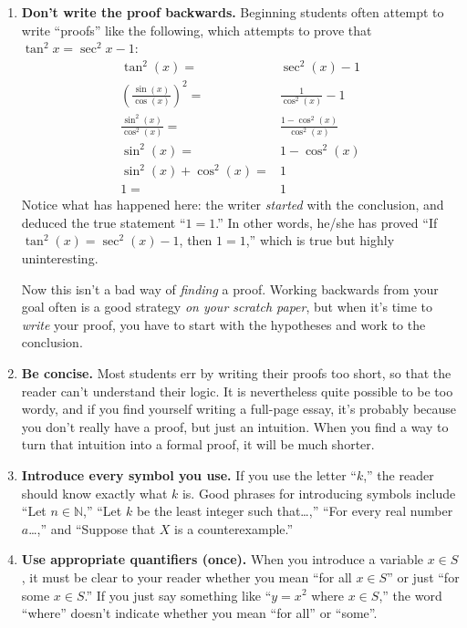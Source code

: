 \begin{enumerate}
\item \textbf{Don't write the proof backwards.} Beginning students often attempt to write ``proofs'' like the following, which attempts to prove that $\tan^2 x  = \sec^2 x - 1$:
\begin{align*}
\tan^2(x) =& \sec^2(x) - 1 \\
\left(\frac{\sin(x)}{\cos(x)}\right)^2 =& \frac{1}{\cos^2(x)} - 1 \\
\frac{\sin^2(x)}{\cos^2(x)} =&  \frac{1-\cos^2(x)}{\cos^2(x)} \\
\sin^2(x) =& 1-\cos^2(x) \\
\sin^2(x) + \cos^2(x) =& 1 \\
1 =& 1
\end{align*}
Notice what has happened here:  the writer \emph{started} with the conclusion, and deduced the true statement ``$1=1$.'' In other words, he/she has proved ``If $\tan^2(x) = \sec^2(x) - 1$, then $1=1$,'' which is true but highly uninteresting.

Now this isn't a bad way of \emph{finding} a proof.
Working backwards from your goal often is a good strategy \emph{on your scratch paper},
but when it's time to \emph{write} your proof,
you have to start with the hypotheses and work to the conclusion.

\item \textbf{Be concise.} Most students err by writing their proofs too short, so that the reader can't understand their logic. It is nevertheless quite possible to be too wordy, and if you find yourself writing a full-page essay, it's probably because you don't really have a proof, but just an intuition. When you find a way to turn that intuition into a formal proof, it will be much shorter.

\item \textbf{Introduce every symbol you use.} If you use the letter ``$k$,'' the reader should know exactly what $k$ is. Good phrases for introducing symbols include ``Let $n\in \mathbb{N}$,'' ``Let $k$ be the least integer such that\ldots,'' ``For every real number $a$\ldots,'' and ``Suppose that $X$ is a counterexample.''
  
\item \textbf{Use appropriate quantifiers (once).} When you introduce a variable $x\in S$, it must be clear to your reader whether you mean ``for all $x\in S$'' or just ``for some $x\in S$.'' If you just say something like ``$y=x^2$ where $x\in S$,'' the word ``where'' doesn't indicate whether you mean ``for all'' or ``some''.


\end{enumerate}
